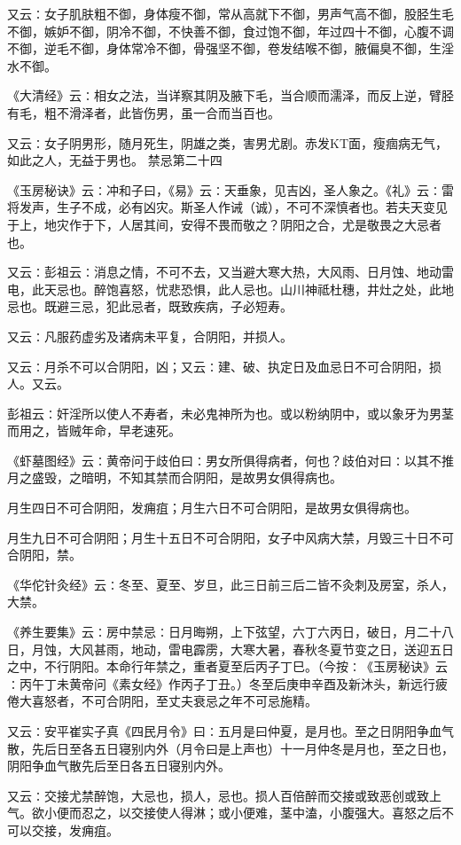 \documentclass[a4paper,12pt,UTF8,twoside]{ctexbook}
\begin{document}
又云∶女子肌肤粗不御，身体瘦不御，常从高就下不御，男声气高不御，股胫生毛不御，嫉妒不御，阴冷不御，不快善不御，食过饱不御，年过四十不御，心腹不调不御，逆毛不御，身体常冷不御，骨强坚不御，卷发结喉不御，腋偏臭不御，生淫水不御。

《大清经》云∶相女之法，当详察其阴及腋下毛，当合顺而濡泽，而反上逆，臂胫有毛，粗不滑泽者，此皆伤男，虽一合而当百也。

又云∶女子阴男形，随月死生，阴雄之类，害男尤剧。赤发KT面，瘦痼病无气，如此之人，无益于男也。
禁忌第二十四

《玉房秘诀》云∶冲和子曰，《易》云∶天垂象，见吉凶，圣人象之。《礼》云∶雷将发声，生子不成，必有凶灾。斯圣人作诫（诚），不可不深慎者也。若夫天变见于上，地灾作于下，人居其间，安得不畏而敬之？阴阳之合，尤是敬畏之大忌者也。

又云∶彭祖云∶消息之情，不可不去，又当避大寒大热，大风雨、日月蚀、地动雷电，此天忌也。醉饱喜怒，忧悲恐惧，此人忌也。山川神祗杜穗，井灶之处，此地忌也。既避三忌，犯此忌者，既致疾病，子必短寿。

又云∶凡服药虚劣及诸病未平复，合阴阳，并损人。

又云∶月杀不可以合阴阳，凶；又云∶建、破、执定日及血忌日不可合阴阳，损人。又云。

彭祖云∶奸淫所以使人不寿者，未必鬼神所为也。或以粉纳阴中，或以象牙为男茎而用之，皆贼年命，早老速死。

《虾墓图经》云∶黄帝问于歧伯曰∶男女所俱得病者，何也？歧伯对曰∶以其不推月之盛毁，之暗明，不知其禁而合阴阳，是故男女俱得病也。

月生四日不可合阴阳，发痈疽；月生六日不可合阴阳，是故男女俱得病也。

月生九日不可合阴阳；月生十五日不可合阴阳，女子中风病大禁，月毁三十日不可合阴阳，禁。

《华佗针灸经》云∶冬至、夏至、岁旦，此三日前三后二皆不灸刺及房室，杀人，大禁。

《养生要集》云∶房中禁忌∶日月晦朔，上下弦望，六丁六丙日，破日，月二十八日，月蚀，大风甚雨，地动，雷电霹雳，大寒大暑，春秋冬夏节变之日，送迎五日之中，不行阴阳。本命行年禁之，重者夏至后丙子丁巳。（今按∶《玉房秘诀》云∶丙午丁未黄帝问《素女经》作丙子丁丑。）冬至后庚申辛酉及新沐头，新远行疲倦大喜怒者，不可合阴阳，至丈夫衰忌之年不可忌施精。

又云∶安平崔实子真《四民月令》曰∶五月是曰仲夏，是月也。至之日阴阳争血气散，先后日至各五日寝别内外（月令曰是上声也）十一月仲冬是月也，至之日也，阴阳争血气散先后至日各五日寝别内外。

又云∶交接尤禁醉饱，大忌也，损人，忌也。损人百倍醉而交接或致恶创或致上气。欲小便而忍之，以交接使人得淋；或小便难，茎中溘，小腹强大。喜怒之后不可以交接，发痈疽。
\end{document}
